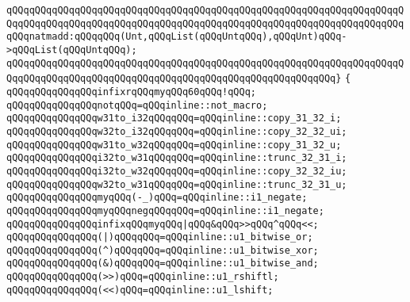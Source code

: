 \verb|qQQqqQQqqQQqqQQqqQQqqQQqqQQqqQQqqQQqqQQqqQQqqQQqqQQqqQQqqQQqqQQqqQQqqQQqqQQqqQQqqQQqqQQqqQQqqQQqqQQqqQQqqQQqqQQqqQQqqQQqqQQqqQQqqQQqqQQqqQQqqQQqnatmadd:qQQqqQQq(Unt,qQQqList(qQQqUntqQQq),qQQqUnt)qQQq->qQQqList(qQQqUntqQQq);|\newline
\newline
\verb|qQQqqQQqqQQqqQQqqQQqqQQqqQQqqQQqqQQqqQQqqQQqqQQqqQQqqQQqqQQqqQQqqQQqqQQqqQQqqQQqqQQqqQQqqQQqqQQqqQQqqQQqqQQqqQQqqQQqqQQqqQQqqQQq}|\newline
\verb|{|\newline
\verb|qQQqqQQqqQQqqQQqinfixrqQQqmyqQQq60qQQq!qQQq;|\newline
\newline
\verb|qQQqqQQqqQQqqQQqnotqQQq=qQQqinline::not_macro;|\newline
\newline
\verb|qQQqqQQqqQQqqQQqw31to_i32qQQqqQQq=qQQqinline::copy_31_32_i;|\newline
\verb|qQQqqQQqqQQqqQQqw32to_i32qQQqqQQq=qQQqinline::copy_32_32_ui;|\newline
\verb|qQQqqQQqqQQqqQQqw31to_w32qQQqqQQq=qQQqinline::copy_31_32_u;|\newline
\verb|qQQqqQQqqQQqqQQqi32to_w31qQQqqQQq=qQQqinline::trunc_32_31_i;|\newline
\verb|qQQqqQQqqQQqqQQqi32to_w32qQQqqQQq=qQQqinline::copy_32_32_iu;|\newline
\verb|qQQqqQQqqQQqqQQqw32to_w31qQQqqQQq=qQQqinline::trunc_32_31_u;|\newline
\newline
\verb|qQQqqQQqqQQqqQQqmyqQQq(-_)qQQq=qQQqinline::i1_negate;|\newline
\verb|qQQqqQQqqQQqqQQqmyqQQqnegqQQqqQQq=qQQqinline::i1_negate;|\newline
\newline
\verb|qQQqqQQqqQQqqQQqinfixqQQqmyqQQq|\verb#|qQQq&qQQq>>qQQq^qQQq<<;#\newline
\newline
\verb|qQQqqQQqqQQqqQQq(|\verb#|)qQQqqQQq=qQQqinline::u1_bitwise_or;#\newline
\verb|qQQqqQQqqQQqqQQq(^)qQQqqQQq=qQQqinline::u1_bitwise_xor;|\newline
\verb|qQQqqQQqqQQqqQQq(&)qQQqqQQq=qQQqinline::u1_bitwise_and;|\newline
\verb|qQQqqQQqqQQqqQQq(>>)qQQq=qQQqinline::u1_rshiftl;|\newline
\verb|qQQqqQQqqQQqqQQq(<<)qQQq=qQQqinline::u1_lshift;|\newline
\newline
